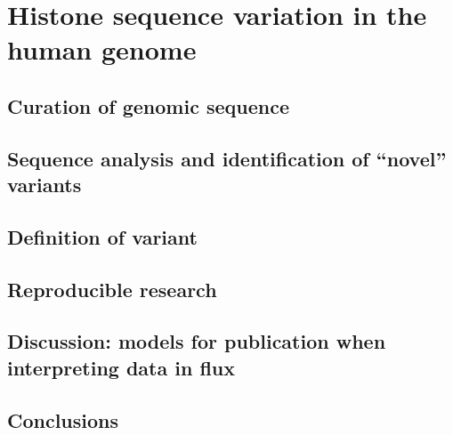 \chapter{Histone sequence variation in the human genome}
\label{ch:catalog}


\section{Curation of genomic sequence}
\section{Sequence analysis and identification of ``novel'' variants}
\section{Definition of variant}
\section{Reproducible research}
\section{Discussion: models for publication when interpreting data in flux}
\section{Conclusions}
